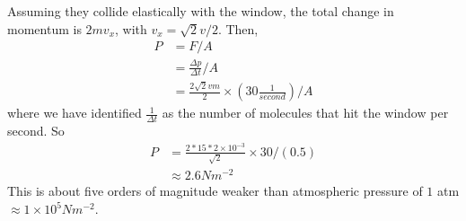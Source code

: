 \documentclass{article}
\begin{document}
Assuming they collide elastically with the window, the total change in momentum is $2mv_x$, with $v_x=\sqrt{2}v/2$. Then,
\begin{align*}
P &= F/A \\
&= \frac{\Delta p}{\Delta t}/A \\
&= \frac{2\sqrt{2}vm}{2}\times\left(30 \frac{1}{second}\right)/A
\end{align*}
where we have identified $\frac{1}{\Delta t}$ as the number of molecules that hit the window per second. So
\begin{align*}
P &= \frac{2*15*2\times10^{-3}}{\sqrt{2}}\times30/(0.5) \\
&\approx 2.6 N m^{-2}
\end{align*}
This is about five orders of magnitude weaker than atmospheric pressure of $1$ atm $\approx1\times10^5 Nm^{-2}$.
\end{document}
